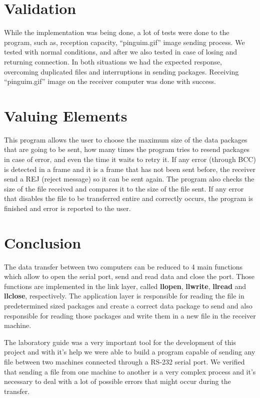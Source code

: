 \documentclass[a4paper]{article}
\begin{document}
\section{Validation}

While the implementation was being done, a lot of tests were done to the program, such as, reception capacity, “pinguim.gif” image sending process. We tested with normal conditions, and after we also tested in case of losing and returning connection. In both situations we had the expected response, overcoming duplicated files and
interruptions in sending packages. Receiving “pinguim.gif” image on the receiver computer was done with success.

\section{Valuing Elements}

This program allows the user to choose the maximum size of the data packages that are going to be sent, how many times the program tries to resend packages in case of error, and even the time it waits to retry it. If any error (through BCC) is detected in a frame and it is a frame that has not been sent before, the receiver send a REJ (reject message) so it can be sent again. The program also checks the size of the file received and compares it to the size of the file sent. If any error that disables the file to be transferred entire and correctly occurs, the program is finished and error is reported to the user.

\section{Conclusion}
The data transfer between two computers can be reduced to 4 main functions which allow to open the serial port, send and read data and close the port. Those functions are implemented in the link layer, called \textbf{llopen}, \textbf{llwrite}, \textbf{llread} and \textbf{llclose}, respectively. The application layer is responsible for reading the file in predetermined sized packages and create a correct data package to send and also responsible for reading those packages and write them in a new file in the receiver machine.

The laboratory guide was a very important tool for the development of this project and with it's help we were able to build a program capable of sending any file between two machines connected through a RS-232 serial port. We verified that sending a file from one machine to another is a very complex process and it's necessary to deal with a lot of possible errors that might occur during the transfer. 
\end{document}
